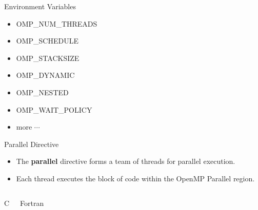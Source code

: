 \documentclass[10pt,t]{beamer}
\begin{document}
\begin{frame}{Environment Variables}
  \begin{itemize}
    \item OMP\_NUM\_THREADS
    \item OMP\_SCHEDULE
    \item OMP\_STACKSIZE
    \item OMP\_DYNAMIC
    \item OMP\_NESTED
    \item OMP\_WAIT\_POLICY
    \item more $\cdots$
  \end{itemize}
\end{frame}

\begin{frame}{Parallel Directive}
  \begin{itemize}
    \item The {\bf parallel} directive forms a team of threads for parallel execution.
    \item Each thread executes the block of code within the OpenMP Parallel region.
  \end{itemize}
  \vspace{-0.5cm}
  \begin{columns}
    \begin{exampleblock}{C}
      
    \end{exampleblock}
    \begin{exampleblock}{Fortran}
      
    \end{exampleblock}
  \end{columns}
\end{frame}
\end{document}
